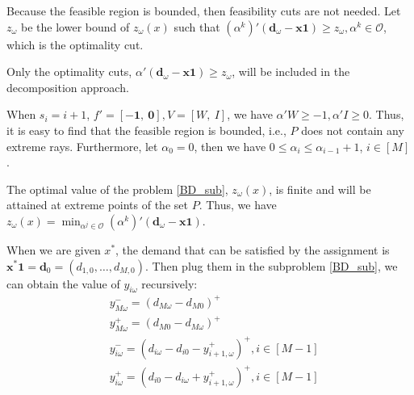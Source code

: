 Because the feasible region is bounded, then feasibility cuts are not needed. Let $z_{\omega}$ be the lower bound of $z_{\omega}(x)$ such that $(\alpha^{k}){'}(\mathbf{d}_{\omega}- \mathbf{x} \mathbf{1}) \geq z_{\omega}, \alpha^k \in \mathcal{O}$, which is the optimality cut.

\begin{corollary}
  Only the optimality cuts, $\alpha{'}(\mathbf{d}_{\omega}- \mathbf{x} \mathbf{1}) \geq z_{\omega}$, will be included in the decomposition approach.
\end{corollary}


\begin{corollary}
  When $s_i = i+1$, $f{'} = [-\mathbf{1},~\mathbf{0}], V =[W,~I]$, we have $\alpha{'}W \geq -1, \alpha{'}I \geq 0$. Thus, it is easy to find that the feasible region is bounded, i.e., $P$ does not contain any extreme rays. Furthermore, let $\alpha_0 = 0$, then we have $0 \leq \alpha_i \leq \alpha_{i-1} +1$, $i \in [M]$.

\end{corollary}

\begin{corollary}
The optimal value of the problem \eqref{BD_sub}, $z_{\omega}(x)$, is finite and will be attained at extreme points of the set $P$. Thus, we have $z_{\omega}(x) = \min_{\alpha^j \in \mathcal{O}} (\alpha^{k}){'}(\mathbf{d}_{\omega}- \mathbf{x} \mathbf{1})$. 
\end{corollary}


When we are given $x^{*}$, the demand that can be satisfied by the assignment is $\mathbf{x}^{*} \mathbf{1} = \mathbf{d}_0 = (d_{1,0},\ldots,d_{M,0})$.
Then plug them in the subproblem \eqref{BD_sub}, we can obtain the value of $y_{i \omega}$ recursively:
\begin{equation}\label{y_recursively}
\begin{aligned}
  & y_{M \omega}^{-}=\left(d_{M \omega}-d_{M 0}\right)^{+} \\
  & y_{M \omega}^{+}=\left(d_{M 0}-d_{M \omega}\right)^{+} \\
  & y_{i \omega}^{-}=\left(d_{i \omega}-d_{i 0} - y_{i+1, \omega}^{+} \right)^{+}, i \in [M-1] \\
  & y_{i \omega}^{+}=\left(d_{i 0}- d_{i \omega} + y_{i+1, \omega}^{+}\right)^{+}, i \in [M-1]
\end{aligned}
\end{equation}

